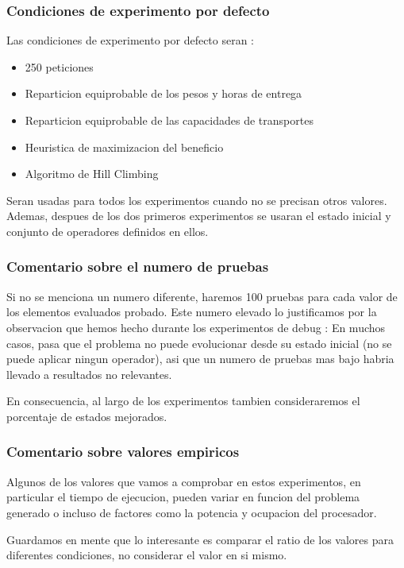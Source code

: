 \documentclass{article}
\begin{document}
\subsubsection{Condiciones de experimento por defecto}

\noindent Las condiciones de experimento por defecto seran :
\begin{itemize}
\item 250 peticiones
\item Reparticion equiprobable de los pesos y horas de entrega
\item Reparticion equiprobable de las capacidades de transportes
\item Heuristica de maximizacion del beneficio
\item Algoritmo de Hill Climbing
\end{itemize}

Seran usadas para todos los experimentos cuando no se precisan otros valores.
Ademas, despues de los dos primeros experimentos se usaran el estado inicial y
conjunto de operadores definidos en ellos.

\subsubsection{Comentario sobre el numero de pruebas}

Si no se menciona un numero diferente, haremos 100 pruebas para cada valor de
los elementos evaluados probado. Este numero elevado lo justificamos por la
observacion que hemos hecho durante los experimentos de debug : En muchos casos,
pasa que el problema no puede evolucionar desde su estado inicial (no se puede
aplicar ningun operador), asi que un numero de pruebas mas bajo habria llevado a
resultados no relevantes.

En consecuencia, al largo de los experimentos tambien consideraremos el
porcentaje de estados mejorados.

\subsubsection{Comentario sobre valores empiricos}

Algunos de los valores que vamos a comprobar en estos experimentos, en
particular el tiempo de ejecucion, pueden variar en funcion del problema
generado o incluso de factores como la potencia y ocupacion del procesador.

Guardamos en mente que lo interesante es comparar el ratio de los valores para
diferentes condiciones, no considerar el valor en si mismo.
\end{document}
